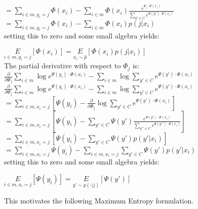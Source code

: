 \documentclass[]{article}
\begin{document}
$ = \underset{i \in m, y_i = j}{\sum} \Phi(x_i) -  \underset{i \in m}{\sum} \Phi(x_i) \frac{e^{\Psi_j \cdot \Phi(x_i)}}{\sum_{y\prime \in C}e^{\Psi(y') \cdot \Phi(x_i)}}$\\

$ = \underset{i \in m, y_i = j}{\sum} \Phi(x_i) -  \underset{i \in m}{\sum} \Phi(x_i) p(j|x_i)$\\

\noindent setting this to zero and some small algebra yields:

$\underset{i \in m, y_i = j}{E}\left[\Phi(x_i)\right] = \underset{x_i \sim \hat{p}}{E}\left[\Phi(x_i) p(j|x_i)\right]$\\

\noindent The partial derivative with respect to $\Phi_j$ is:\\

$\frac{\partial}{\partial \Phi_j} \underset{i \in m}{\sum} \log e^{\Psi(y_i) \cdot \Phi(x_i)} - \underset{i \in m}{\sum} \log \sum_{y\prime \in C}e^{\Psi(y') \cdot \Phi(x_i)}$\\

$\frac{\partial}{\partial \Phi_j} \underset{i \in m}{\sum} \log e^{\Psi(y_i) \cdot \Phi(x_i)} - \underset{i \in m}{\sum} \log \sum_{y\prime \in C}e^{\Psi(y') \cdot \Phi(x_i)}$\\

$ = \underset{i \in m, x_i = j}{\sum} \left[\Psi(y_i) - \frac{\partial}{\partial \Phi_j} \log \sum_{y\prime \in C}e^{\Psi(y\prime) \cdot \Phi(x_i)}\right]$\\

$ = \underset{i \in m, x_i = j}{\sum} \left[\Psi(y_i) - \sum_{y\prime \in C}\Psi(y') \frac{e^{\Psi(y') \cdot \Phi(x_i)}}{\sum_{y\prime\prime \in C}e^{\Psi(y\prime\prime) \cdot \Phi(x_i)}}\right]$\\

$ = \underset{i \in m, x_i = j}{\sum} \left[\Psi(y_i) - \sum_{y\prime \in C}\Psi(y') p(y\prime|x_i)\right]$\\

$ = \underset{i \in m, x_i = j}{\sum} \Psi(y_i) - \underset{i \in m, x_i = j}{\sum} \sum_{y\prime \in C}\Psi(y') p(y\prime|x_i)$\\

\noindent setting this to zero and some small algebra yields:

$\underset{i \in m, x_i = j}{E}\left[\Psi(y_i)\right] = \underset{y\prime \sim p(\cdot|j)}{E}\left[\Psi(y\prime)\right]$

\noindent This motivates the following Maximum Entropy formulation.
\end{document}
